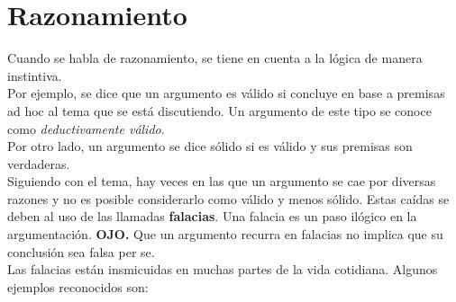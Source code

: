 \section*{Razonamiento}

Cuando se habla de razonamiento, se tiene en cuenta a la
lógica de manera instintiva. \\

Por ejemplo, se dice que un argumento es válido si concluye
en base a premisas ad hoc al tema que se está discutiendo.
Un argumento de este tipo se conoce como
\textit{deductivamente válido}. \\

Por otro lado, un argumento se dice sólido si es válido y
sus premisas son verdaderas. \\

Siguiendo con el tema, hay veces en las que un argumento
se cae por diversas razones y no es posible considerarlo
como válido y menos sólido. Estas caídas se deben al uso
de las llamadas \textbf{falacias}. Una falacia es un paso
ilógico en la argumentación. \textbf{OJO.} Que un argumento
recurra en falacias no implica que su conclusión sea falsa
per se. \\

Las falacias están insmicuidas en muchas partes de la vida
cotidiana. Algunos ejemplos reconocidos son:

